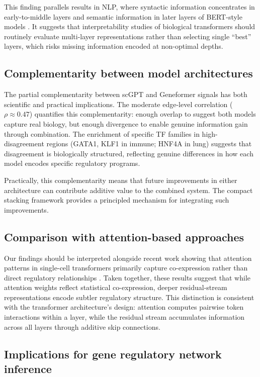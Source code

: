 \documentclass[11pt]{article}
\begin{document}
This finding parallels results in NLP, where syntactic information concentrates in early-to-middle layers and semantic information in later layers of BERT-style models \cite{tenney2019bert}.
It suggests that interpretability studies of biological transformers should routinely evaluate multi-layer representations rather than selecting single ``best'' layers, which risks missing information encoded at non-optimal depths.

\subsection*{Complementarity between model architectures}

The partial complementarity between scGPT and Geneformer signals has both scientific and practical implications.
The moderate edge-level correlation ($\rho \approx 0.47$) quantifies this complementarity: enough overlap to suggest both models capture real biology, but enough divergence to enable genuine information gain through combination.
The enrichment of specific TF families in high-disagreement regions (GATA1, KLF1 in immune; HNF4A in lung) suggests that disagreement is biologically structured, reflecting genuine differences in how each model encodes specific regulatory programs.

Practically, this complementarity means that future improvements in either architecture can contribute additive value to the combined system.
The compact stacking framework provides a principled mechanism for integrating such improvements.

\subsection*{Comparison with attention-based approaches}

Our findings should be interpreted alongside recent work showing that attention patterns in single-cell transformers primarily capture co-expression rather than direct regulatory relationships \cite{kendiukhov2025attention}.
Taken together, these results suggest that while attention weights reflect statistical co-expression, deeper residual-stream representations encode subtler regulatory structure.
This distinction is consistent with the transformer architecture's design: attention computes pairwise token interactions within a layer, while the residual stream accumulates information across all layers through additive skip connections.

\subsection*{Implications for gene regulatory network inference}
\end{document}
